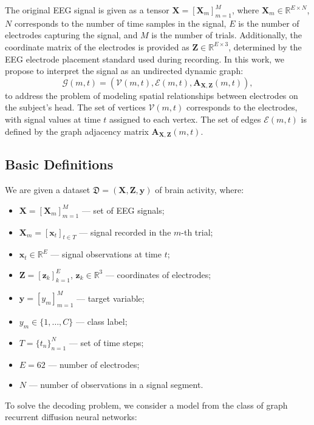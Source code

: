 \documentclass[12pt, twoside]{article}
\begin{document}
The original EEG signal is given as a tensor $\mathbf{X} = [\mathbf{X}_m]_{m=1}^M$, where $\mathbf{X}_m \in \mathbb{R}^{E \times N}$, $N$ corresponds to the number of time samples in the signal, $E$ is the number of electrodes capturing the signal, and $M$ is the number of trials. Additionally, the coordinate matrix of the electrodes is provided as $\mathbf{Z} \in \mathbb{R}^{E \times 3}$, determined by the EEG electrode placement standard used during recording. In this work, we propose to interpret the signal as an undirected dynamic graph:
\[
\mathcal{G}(m,t) = \left( \mathcal{V}(m,t), \mathcal{E}(m,t), \mathbf{A}_{\mathbf{X},\mathbf{Z}}(m,t) \right),
\]
to address the problem of modeling spatial relationships between electrodes on the subject's head. The set of vertices $\mathcal{V}(m,t)$ corresponds to the electrodes, with signal values at time $t$ assigned to each vertex. The set of edges $\mathcal{E}(m,t)$ is defined by the graph adjacency matrix $\mathbf{A}_{\mathbf{X},\mathbf{Z}}(m,t)$.

\subsection{Basic Definitions}

We are given a dataset $\mathfrak{D} = (\mathbf{X}, \mathbf{Z}, \mathbf{y})$ of brain activity, where:
\begin{itemize}
    \item $\mathbf{X} = [\mathbf{X}_m]_{m=1}^M$ — set of EEG signals;
    \item $\mathbf{X}_m = [\mathbf{x}_t]_{t \in T}$ — signal recorded in the $m$-th trial;
    \item $\mathbf{x}_t \in \mathbb{R}^E$ — signal observations at time $t$;
    \item $\mathbf{Z} = [\mathbf{z}_k]_{k=1}^E$, $\mathbf{z}_k \in \mathbb{R}^3$ — coordinates of electrodes;
    \item $\mathbf{y} = [y_m]_{m=1}^M$ — target variable;
    \item $y_m \in \{1, \ldots, C\}$ — class label;
    \item $T = \{t_n\}_{n=1}^N$ — set of time steps;
    \item $E = 62$ — number of electrodes;
    \item $N$ — number of observations in a signal segment.
\end{itemize}

To solve the decoding problem, we consider a model from the class of graph recurrent diffusion neural networks:
\end{document}
